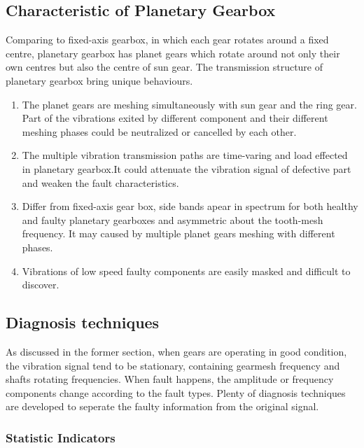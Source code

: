 \subsection{Characteristic of Planetary Gearbox}

Comparing to fixed-axis gearbox, in which each gear rotates around a fixed centre, planetary gearbox has planet gears which rotate around not only their own centres but also the centre of sun gear. The transmission structure of planetary gearbox bring unique behaviours. \cite{review}
\begin{enumerate}
\item The planet gears are meshing simultaneously with sun gear and the ring gear. Part of the vibrations exited by different component and their different meshing phases could be neutralized or cancelled by each other.

\item The multiple vibration transmission paths are time-varing and load effected in planetary gearbox.It could attenuate the vibration signal of defective part and weaken the fault characteristics.

\item Differ from fixed-axis gear box, side bands apear in spectrum for both healthy and faulty planetary gearboxes and asymmetric about the tooth-mesh frequency. It may caused by multiple planet gears meshing with different phases.

\item Vibrations of low speed faulty components are easily masked and difficult to discover.
\end{enumerate}


\subsection{Diagnosis techniques}

As discussed in the former section, when gears are operating in good condition, the vibration signal tend to be stationary, containing gearmesh frequency and shafts rotating frequencies. When fault happens, the amplitude or frequency components change according to the fault types.
Plenty of diagnosis techniques are developed to seperate the faulty information from the original signal. \cite{practical}

\subsubsection{Statistic Indicators}

